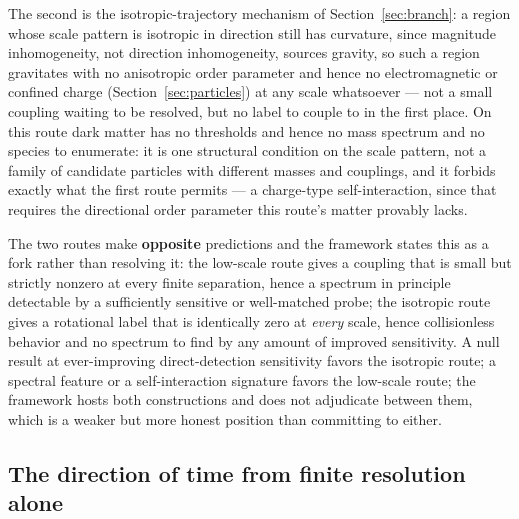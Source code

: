 \documentclass[aps,prd,twocolumn,superscriptaddress,nofootinbib]{revtex4-2}
\begin{document}
The second is the isotropic-trajectory mechanism of
Section~\ref{sec:branch}: a region whose scale pattern is isotropic in
direction still has curvature, since magnitude inhomogeneity, not
direction inhomogeneity, sources gravity, so such a region gravitates
with no anisotropic order parameter and hence no electromagnetic or
confined charge (Section~\ref{sec:particles}) at any scale whatsoever —
not a small coupling waiting to be resolved, but no label to couple to
in the first place. On this route dark matter has no thresholds and
hence no mass spectrum and no species to enumerate: it is one structural
condition on the scale pattern, not a family of candidate particles with
different masses and couplings, and it forbids exactly what the first
route permits — a charge-type self-interaction, since that requires the
directional order parameter this route's matter provably lacks.

The two routes make \textbf{opposite} predictions and the framework
states this as a fork rather than resolving it: the low-scale route
gives a coupling that is small but strictly nonzero at every finite
separation, hence a spectrum in principle detectable by a sufficiently
sensitive or well-matched probe; the isotropic route gives a rotational
label that is identically zero at \emph{every} scale, hence collisionless
behavior and no spectrum to find by any amount of improved sensitivity.
A null result at ever-improving direct-detection sensitivity favors the
isotropic route; a spectral feature or a self-interaction signature
favors the low-scale route; the framework hosts both constructions and
does not adjudicate between them, which is a weaker but more honest
position than committing to either.

\subsection{The direction of time from finite resolution alone}
\end{document}
